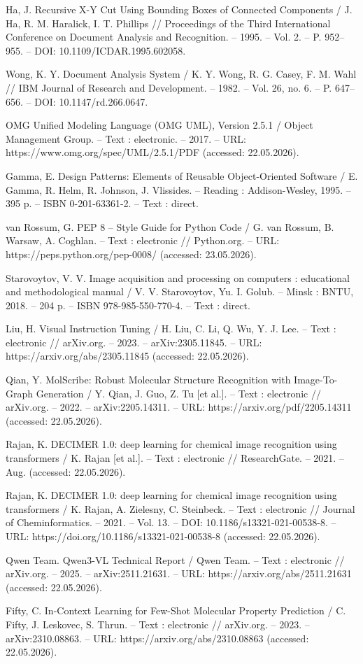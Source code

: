 Ha, J. Recursive X-Y Cut Using Bounding Boxes of Connected Components / J. Ha, R. M. Haralick, I. T. Phillips // Proceedings of the Third International Conference on Document Analysis and Recognition. – 1995. – Vol. 2. – P. 952–955. – DOI: 10.1109/ICDAR.1995.602058.

Wong, K. Y. Document Analysis System / K. Y. Wong, R. G. Casey, F. M. Wahl // IBM Journal of Research and Development. – 1982. – Vol. 26, no. 6. – P. 647–656. – DOI: 10.1147/rd.266.0647.

OMG Unified Modeling Language (OMG UML), Version 2.5.1 / Object Management Group. – Text : electronic. – 2017. – URL: https://www.omg.org/spec/UML/2.5.1/PDF (accessed: 22.05.2026).

Gamma, E. Design Patterns: Elements of Reusable Object-Oriented Software / E. Gamma, R. Helm, R. Johnson, J. Vlissides. – Reading : Addison-Wesley, 1995. – 395 p. – ISBN 0-201-63361-2. – Text : direct.

van Rossum, G. PEP 8 -- Style Guide for Python Code / G. van Rossum, B. Warsaw, A. Coghlan. – Text : electronic // Python.org. – URL: https://peps.python.org/pep-0008/ (accessed: 23.05.2026).

Starovoytov, V. V. Image acquisition and processing on computers : educational and methodological manual / V. V. Starovoytov, Yu. I. Golub. – Minsk : BNTU, 2018. – 204 p. – ISBN 978-985-550-770-4. – Text : direct.

Liu, H. Visual Instruction Tuning / H. Liu, C. Li, Q. Wu, Y. J. Lee. – Text : electronic // arXiv.org. – 2023. – arXiv:2305.11845. – URL: https://arxiv.org/abs/2305.11845 (accessed: 22.05.2026).

Qian, Y. MolScribe: Robust Molecular Structure Recognition with Image-To-Graph Generation / Y. Qian, J. Guo, Z. Tu [et al.]. – Text : electronic // arXiv.org. – 2022. – arXiv:2205.14311. – URL: https://arxiv.org/pdf/2205.14311 (accessed: 22.05.2026).

Rajan, K. DECIMER 1.0: deep learning for chemical image recognition using transformers / K. Rajan [et al.]. – Text : electronic // ResearchGate. – 2021. – Aug. (accessed: 22.05.2026).

Rajan, K. DECIMER 1.0: deep learning for chemical image recognition using transformers / K. Rajan, A. Zielesny, C. Steinbeck. – Text : electronic // Journal of Cheminformatics. – 2021. – Vol. 13. – DOI: 10.1186/s13321-021-00538-8. – URL: https://doi.org/10.1186/s13321-021-00538-8 (accessed: 22.05.2026).

Qwen Team. Qwen3-VL Technical Report / Qwen Team. – Text : electronic // arXiv.org. – 2025. – arXiv:2511.21631. – URL: https://arxiv.org/abs/2511.21631 (accessed: 22.05.2026).

Fifty, C. In-Context Learning for Few-Shot Molecular Property Prediction / C. Fifty, J. Leskovec, S. Thrun. – Text : electronic // arXiv.org. – 2023. – arXiv:2310.08863. – URL: https://arxiv.org/abs/2310.08863 (accessed: 22.05.2026).

